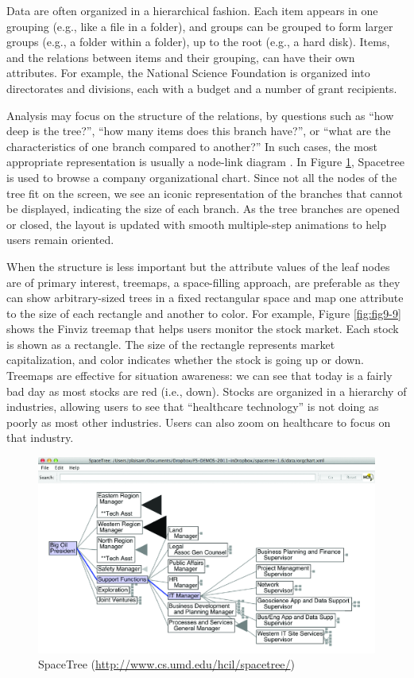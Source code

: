 \documentclass[]{krantz}
\begin{document}
Data are often organized in a hierarchical fashion. Each item appears in
one grouping (e.g., like a file in a folder), and groups can be grouped
to form larger groups (e.g., a folder within a folder), up to the root
(e.g., a hard disk). Items, and the relations between items and their
grouping, can have their own attributes. For example, the National
Science Foundation is organized into directorates and divisions, each
with a budget and a number of grant recipients.

Analysis may focus on the structure of the relations, by questions such
as ``how deep is the tree?'', ``how many items does this branch have?'',
or ``what are the characteristics of one branch compared to another?''
In such cases, the most appropriate representation is usually a
node-link diagram \citep{plaisant2002spacetree, card2002degree}. In
Figure \ref{fig:fig9-8}, Spacetree is used to browse a company
organizational chart. Since not all the nodes of the tree fit on the
screen, we see an iconic representation of the branches that cannot be
displayed, indicating the size of each branch. As the tree branches are
opened or closed, the layout is updated with smooth multiple-step
animations to help users remain oriented.

When the structure is less important but the attribute values of the
leaf nodes are of primary interest, treemaps, a space-filling approach,
are preferable as they can show arbitrary-sized trees in a fixed
rectangular space and map one attribute to the size of each rectangle
and another to color. For example, Figure \ref{fig:fig9-9} shows the
Finviz treemap that helps users monitor the stock market. Each stock is
shown as a rectangle. The size of the rectangle represents market
capitalization, and color indicates whether the stock is going up or
down. Treemaps are effective for situation awareness: we can see that
today is a fairly bad day as most stocks are red (i.e., down). Stocks
are organized in a hierarchy of industries, allowing users to see that
``healthcare technology'' is not doing as poorly as most other
industries. Users can also zoom on healthcare to focus on that industry.

\begin{figure}

{\centering \includegraphics[width=0.9\linewidth]{ChapterViz/figures/fig9-8} 

}

\caption{SpaceTree (\url{http://www.cs.umd.edu/hcil/spacetree/})}\label{fig:fig9-8}
\end{figure}
\end{document}
